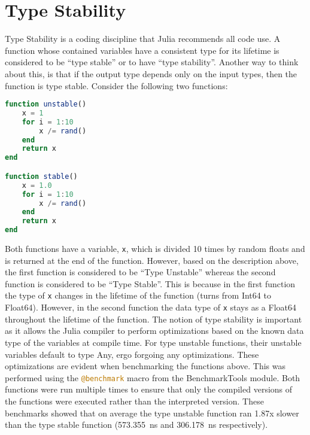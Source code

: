 \section{Type Stability}
\label{TypeStability}
Type Stability is a coding discipline that Julia recommends all code use. A function whose contained variables have a
consistent type for its lifetime is considered to be ``type stable'' or to have ``type stability''. Another way to think
about this, is that if the output type depends only on the input types, then the function is type stable. Consider the
following two functions: 
\begin{lstlisting}[language=Julia]
function unstable()
    x = 1
    for i = 1:10
        x /= rand()
    end
    return x
end

function stable()
    x = 1.0
    for i = 1:10
        x /= rand()
    end
    return x
end
\end{lstlisting}
Both functions have a variable, \lstinline[language=Julia]{x}, which is divided 10 times by random floats and is returned
at the end of the function. However, based on the description above, the first function is considered to be ``Type
Unstable'' whereas the second function is considered to be ``Type Stable''. This is because in the first function the
type of \lstinline[language=Julia]{x} changes in the lifetime of the function (turns from Int64 to Float64). However, in
the second function the data type of \lstinline[language=Julia]{x} stays as a Float64 throughout the lifetime of the
function. The notion of type stability is important as it allows the Julia compiler to perform optimizations based on
the known data type of the variables at compile time. For type unstable functions, their unstable variables default to
type Any, ergo forgoing any optimizations. These optimizations are evident when benchmarking the functions above. This
was performed using the \lstinline[language=Julia]{@benchmark} macro from the BenchmarkTools module. Both functions were
run multiple times to ensure that only the compiled versions of the functions were executed rather than the interpreted
version. These benchmarks showed that on average the type unstable function ran 1.87x slower than the type stable
function (573.355~ns and 306.178~ns respectively).  

